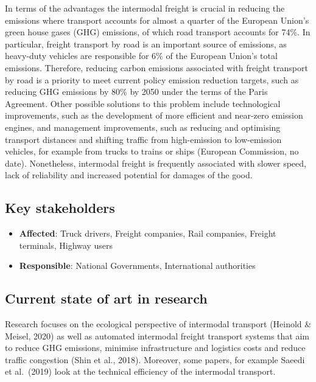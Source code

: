 \documentclass[
]{book}
\providecommand{\tightlist}{%
  \setlength{\itemsep}{0pt}\setlength{\parskip}{0pt}}
\begin{document}
In terms of the advantages the intermodal freight is crucial in reducing the emissions where transport accounts for almost a quarter of the European Union's green house gases (GHG) emissions, of which road transport accounts for 74\%. In particular, freight transport by road is an important source of emissions, as heavy-duty vehicles are responsible for 6\% of the European Union's total emissions. Therefore, reducing carbon emissions associated with freight transport by road is a priority to meet current policy emission reduction targets, such as reducing GHG emissions by 80\% by 2050 under the terms of the Paris Agreement. Other possible solutions to this problem include technological improvements, such as the development of more efficient and near-zero emission engines, and management improvements, such as reducing and optimising transport distances and shifting traffic from high-emission to low-emission vehicles, for example from trucks to trains or ships (European Commission, no date). Nonetheless, intermodal freight is frequently associated with slower speed, lack of reliability and increased potential for damages of the good.

\hypertarget{key-stakeholders-22}{%
\subsection*{Key stakeholders}\label{key-stakeholders-22}}

\begin{itemize}
\tightlist
\item
  \textbf{Affected}: Truck drivers, Freight companies, Rail companies, Freight terminals, Highway users
\item
  \textbf{Responsible}: National Governments, International authorities
\end{itemize}

\hypertarget{current-state-of-art-in-research-22}{%
\subsection*{Current state of art in research}\label{current-state-of-art-in-research-22}}

Research focuses on the ecological perspective of intermodal transport (Heinold \& Meisel, 2020) as well as automated intermodal freight transport systems that aim to reduce GHG emissions, minimise infrastructure and logistics costs and reduce traffic congestion (Shin et al., 2018). Moreover, some papers, for example Saeedi et al.~(2019) look at the technical efficiency of the intermodal transport.
\end{document}
